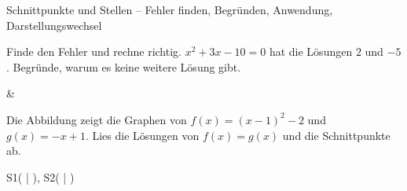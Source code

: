 \begin{aufgabe}{Schnittpunkte und Stellen – Fehler finden, Begründen, Anwendung, Darstellungswechsel}
\begin{teile}
\teil Finde den Fehler und rechne richtig. 
\teil $x^2 + 3x - 10 = 0$ hat die Lösungen $2$ und $-5$. Begründe, warum es keine weitere Lösung gibt.
\end{teile}
\begin{gleichungsraster}[2]
 &
\end{gleichungsraster}
\begin{teile}
\teil Die Abbildung zeigt die Graphen von $f(x) = (x - 1)^2 - 2$ und $g(x) = -x + 1$. Lies die Lösungen von $f(x) = g(x)$ und die Schnittpunkte ab.

\begin{ksys}[xmin=-3,xmax=4,ymin=-3,ymax=5,ablesen]   \end{ksys}
S1( \leerfeld | \leerfeld ), S2( \leerfeld | \leerfeld )
\end{teile}
\end{aufgabe}
